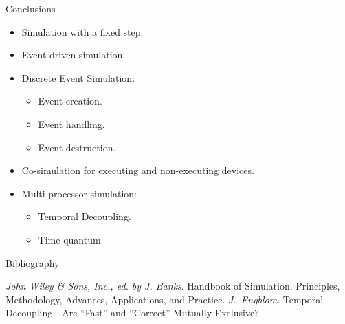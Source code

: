 \begin{frame}{Conclusions}
\begin{itemize}
\item Simulation with a fixed step.
\item Event-driven simulation.
\item Discrete Event Simulation:
  \begin{itemize}
  \item Event creation.
  \item Event handling.
  \item Event destruction.
  \end{itemize}
\item Co-simulation for executing and non-executing devices.
\item Multi-processor simulation:
  \begin{itemize}
    \item Temporal Decoupling.
    \item Time quantum.
  \end{itemize}
\end{itemize}
\end{frame}

\begin{frame}[allowframebreaks]{Bibliography}
\begin{thebibliography}{99}
  \bibitem{} \textit{John Wiley \& Sons, Inc., ed. by J. Banks}. Handbook of
    Simulation. Principles, Methodology, Advances, Applications, and Practice.
  \bibitem{} \textit{J.~Engblom}. Temporal Decoupling - Are “Fast” and
    “Correct” Mutually Exclusive?
\end{thebibliography}
\end{frame}

\finalslide


